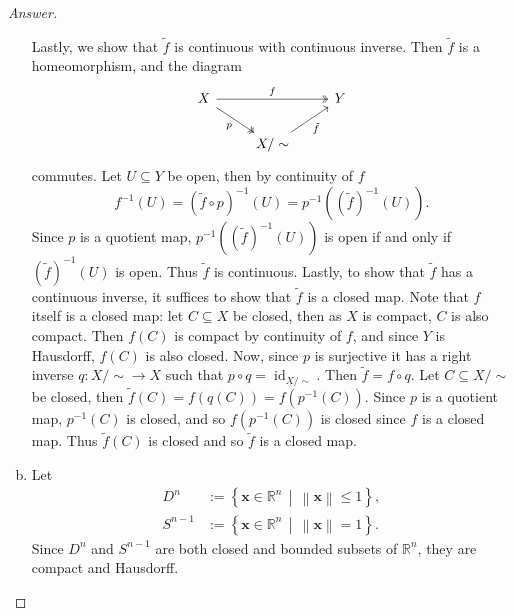 \documentclass[12pt]{article}
\newcommand{\real}{\mathbb{R}}
\newcommand\inv[1]{#1^{-1}}
\newcommand\paren[1]{\left( #1 \right)}
\newcommand\setb[1]{\left \{ #1 \right \}}
\newcommand{\norm}[1]{\left \| #1 \right \|}
\theoremstyle{definition}
\DeclareMathOperator\id{id}
\begin{document}
\begin{proof}[Answer]
\begin{enumerate}[(a)]
        Lastly, we show that $\tilde{f}$ is continuous with continuous inverse. Then $\tilde{f}$ is a homeomorphism, and the diagram 
        \[
            \begin{tikzcd}
                X \arrow[rr,"f",twoheadrightarrow] \arrow[dr, "p"',twoheadrightarrow] &  & Y \\
                & X / \sim \arrow[ur,"\tilde{f}"'] & 
            \end{tikzcd}
        \]
        commutes. Let $U \subseteq Y$ be open, then by continuity of $f$
        \[
            \inv{f}(U) = \inv{ \paren{ \tilde{f} \circ p } } (U) = \inv{p} \paren{ \inv{ \paren{ \tilde{f} }  } (U) }.
        \]
        Since $p$ is a quotient map, $\inv{p} \paren{ \inv{ \paren{ \tilde{f} }  } (U) }$ is open if and only if $\inv{ \paren{ \tilde{f} }  } (U)$ is open. Thus $\tilde{f}$ is continuous. Lastly, to show that $\tilde{f}$ has a continuous inverse, it suffices to show that $\tilde{f}$ is a closed map. Note that $f$ itself is a closed map: let $C \subseteq X$ be closed, then as $X$ is compact, $C$ is also compact. Then $f(C)$ is compact by continuity of $f$, and since $Y$ is Hausdorff, $f(C)$ is also closed. Now, since $p$ is surjective it has a right inverse $q : X / \sim \to X$ such that $p \circ q = \id_{X / \sim}$. Then $\tilde{f} = f \circ q$. Let $C \subseteq X / \sim$ be closed, then $\tilde{f}(C) = f \paren{ q(C) } = f \paren{ \inv{p} (C) }$. Since $p$ is a quotient map, $\inv{p}(C)$ is closed, and so $f \paren{ \inv{p} (C) }$ is closed since $f$ is a closed map. Thus $\tilde{f}(C)$ is closed and so $\tilde{f}$ is a closed map.
        \item Let 
        \begin{align*}
            D^n & := \setb{ \mathbf{x} \in \mathbb{R}^n \, \middle| \, \norm{ \mathbf{x} } \leq 1 } , \\
            S^{n-1} & := \setb{ \mathbf{x} \in \mathbb{R}^n \, \middle| \, \norm{ \mathbf{x} } = 1 }.
        \end{align*}
        Since $D^n$ and $S^{n-1}$ are both closed and bounded subsets of $\real^n$, they are compact and Hausdorff.
        

\end{enumerate}
\end{proof}
\end{document}
